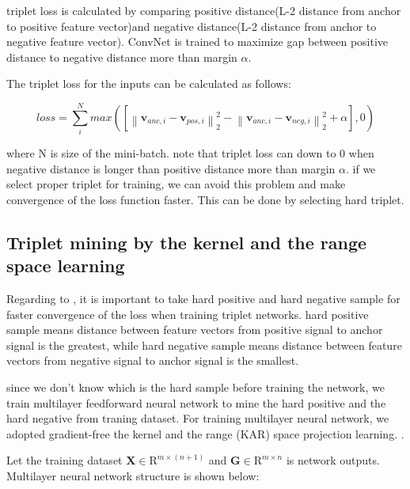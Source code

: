 \documentclass[runningheads]{llncs}
\begin{document}
triplet loss is calculated by comparing positive distance(L-2 distance from anchor to positive feature vector)and negative distance(L-2 distance from anchor to negative feature vector).
ConvNet is trained to maximize gap between positive distance to negative distance more than margin $\alpha$.

The triplet loss for the inputs can be calculated as follows:

\begin{equation}
    loss = \sum_i^N max\left({ \left[ {\left\| {{\mathbf{v}_{anc,i}} - {\mathbf{v}_{pos,i}}} \right\|_2^2} - {\left\| {{\mathbf{v}_{anc,i}} - {\mathbf{v}_{neg,i}}} \right\|_2^2}  + \alpha \right]}, 0 \right)
\end{equation} 

where N is size of the mini-batch.
note that triplet loss can down to 0 when negative distance is longer than positive distance more than margin $\alpha$.
if we select proper triplet for training, we can avoid this problem and make convergence of the loss function faster. This can be done by selecting hard triplet.


\subsection{Triplet mining by the kernel and the range space learning}

Regarding to \cite{schroff2015facenet}, it is important to take hard positive and hard negative sample for faster convergence of the loss when training triplet networks.
hard positive sample means distance between feature vectors from positive signal to anchor signal is the greatest, while hard negative sample means distance between feature vectors from negative signal to anchor signal is the smallest.

since we don't know which is the hard sample before training the network, we train multilayer feedforward neural network to mine the hard positive and the hard negative from traning dataset.
For training multilayer neural network, we adopted gradient-free the kernel and the range (KAR) space projection learning. \cite{toh2018learning,toh2018gradient}.

Let the training dataset $\mathbf{X}\in{\mathrm{R}}^{m \times (n+1)}$ and $\mathbf{G}\in{\mathrm{R}}^{m \times n}$ is network outputs.
Multilayer neural network structure is shown below:
\end{document}
